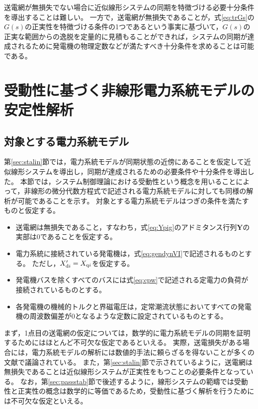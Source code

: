 \documentclass[tombow,dvipdfmx]{corona-a5}
\begin{document}
送電網が無損失でない場合に近似線形システムの同期を特徴づける必要十分条件を導出することは難しい。
一方で，送電網が無損失であることが，式\ref{eq:trGs}の$G(s)$の正実性を特徴づける条件の1つであるという事実に基づいて，$G(s)$の正実な範囲からの逸脱を定量的に見積もることができれば，システムの同期が達成されるために発電機の物理定数などが満たすべき十分条件を求めることは可能である。


\section{受動性に基づく非線形電力系統モデルの安定性解析}

\subsection{対象とする電力系統モデル}\label{sec:objmod}

第\ref{sec:stalin}節では，電力系統モデルが同期状態の近傍にあることを仮定して近似線形システムを導出し，同期が達成されるための必要条件や十分条件を導出した。
本節では，システム制御理論における受動性という概念を用いることによって，非線形の微分代数方程式で記述される電力系統モデルに対しても同様の解析が可能であることを示す。
対象とする電力系統モデルはつぎの条件を満たすものと仮定する。

\begin{itemize}
\item 送電網は無損失であること，すなわち，式\ref{eq:Ypig}のアドミタンス行列$\bm{Y}$の実部は0であることを仮定する。
\item 電力系統に接続されている発電機は，式\ref{eq:gendynVI}で記述されるものとする。
ただし，$X_{{\rm d}i}'=X_{{\rm q}i}$を仮定する。
\item 発電機バスを除くすべてのバスには式\ref{eq:cpw}で記述される定電力の負荷が接続されているものとする。
\item 各発電機の機械的トルクと界磁電圧は，定常潮流状態においてすべての発電機の周波数偏差が0となるような定数に設定されているものとする。
\end{itemize}
まず，1点目の送電網の仮定については，数学的に電力系統モデルの同期を証明するためにはほとんど不可欠な仮定であるといえる。
実際，送電損失がある場合には，電力系統モデルの解析には数値的手法に頼らざるを得ないことが多くの文献で議論されている\cite{narasimhamurthi1984existence,yang2019distributed}。
また，第\ref{sec:stalin}節で示されているように，送電網は無損失であることは近似線形システムが正実性をもつことの必要条件となっている。
なお，第\ref{sec:passstab}節で後述するように，線形システムの範疇では受動性と正実性の概念は数学的に等価であるため，受動性に基づく解析を行うためには不可欠な仮定といえる。
\end{document}
